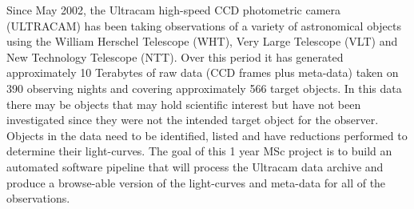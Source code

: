 Since May 2002, the  Ultracam high-speed CCD photometric camera 
(ULTRACAM) has been taking observations of a variety of astronomical 
objects using the William Herschel Telescope (WHT), Very Large 
Telescope (VLT) and New Technology Telescope (NTT). Over this period 
it has generated approximately 10 Terabytes of raw data (CCD frames 
plus meta-data) taken on 390 observing nights and covering 
approximately 566 target objects. In this data there may be objects 
that may hold scientific interest but have not been investigated since they were not the intended target object for the observer. 
Objects in the data need to be identified, listed and have 
reductions performed to determine their light-curves. The goal of 
this 1 year MSc project is to build an automated software pipeline 
that will process the Ultracam data archive and produce a 
browse-able version of the light-curves and meta-data for all of the 
observations. 
